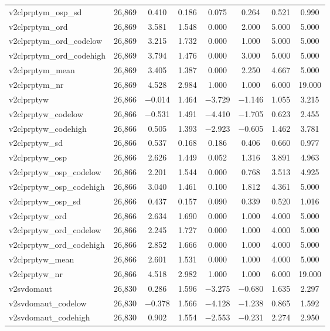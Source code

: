 \begin{table}[!htbp]
\begin{tabular}{@{\extracolsep{5pt}}lccccccc}
v2clprptym\_osp\_sd & 26,869 & 0.410 & 0.186 & 0.075 & 0.264 & 0.521 & 0.990 \\ 
v2clprptym\_ord & 26,869 & 3.581 & 1.548 & 0.000 & 2.000 & 5.000 & 5.000 \\ 
v2clprptym\_ord\_codelow & 26,869 & 3.215 & 1.732 & 0.000 & 1.000 & 5.000 & 5.000 \\ 
v2clprptym\_ord\_codehigh & 26,869 & 3.794 & 1.476 & 0.000 & 3.000 & 5.000 & 5.000 \\ 
v2clprptym\_mean & 26,869 & 3.405 & 1.387 & 0.000 & 2.250 & 4.667 & 5.000 \\ 
v2clprptym\_nr & 26,869 & 4.528 & 2.984 & 1.000 & 1.000 & 6.000 & 19.000 \\ 
v2clprptyw & 26,866 & $-$0.014 & 1.464 & $-$3.729 & $-$1.146 & 1.055 & 3.215 \\ 
v2clprptyw\_codelow & 26,866 & $-$0.531 & 1.491 & $-$4.410 & $-$1.705 & 0.623 & 2.455 \\ 
v2clprptyw\_codehigh & 26,866 & 0.505 & 1.393 & $-$2.923 & $-$0.605 & 1.462 & 3.781 \\ 
v2clprptyw\_sd & 26,866 & 0.537 & 0.168 & 0.186 & 0.406 & 0.660 & 0.977 \\ 
v2clprptyw\_osp & 26,866 & 2.626 & 1.449 & 0.052 & 1.316 & 3.891 & 4.963 \\ 
v2clprptyw\_osp\_codelow & 26,866 & 2.201 & 1.544 & 0.000 & 0.768 & 3.513 & 4.925 \\ 
v2clprptyw\_osp\_codehigh & 26,866 & 3.040 & 1.461 & 0.100 & 1.812 & 4.361 & 5.000 \\ 
v2clprptyw\_osp\_sd & 26,866 & 0.437 & 0.157 & 0.090 & 0.339 & 0.520 & 1.016 \\ 
v2clprptyw\_ord & 26,866 & 2.634 & 1.690 & 0.000 & 1.000 & 4.000 & 5.000 \\ 
v2clprptyw\_ord\_codelow & 26,866 & 2.245 & 1.727 & 0.000 & 1.000 & 4.000 & 5.000 \\ 
v2clprptyw\_ord\_codehigh & 26,866 & 2.852 & 1.666 & 0.000 & 1.000 & 4.000 & 5.000 \\ 
v2clprptyw\_mean & 26,866 & 2.601 & 1.531 & 0.000 & 1.000 & 4.000 & 5.000 \\ 
v2clprptyw\_nr & 26,866 & 4.518 & 2.982 & 1.000 & 1.000 & 6.000 & 19.000 \\ 
v2svdomaut & 26,830 & 0.286 & 1.596 & $-$3.275 & $-$0.680 & 1.635 & 2.297 \\ 
v2svdomaut\_codelow & 26,830 & $-$0.378 & 1.566 & $-$4.128 & $-$1.238 & 0.865 & 1.592 \\ 
v2svdomaut\_codehigh & 26,830 & 0.902 & 1.554 & $-$2.553 & $-$0.231 & 2.274 & 2.950 \\ 

\end{tabular}
\end{table}
